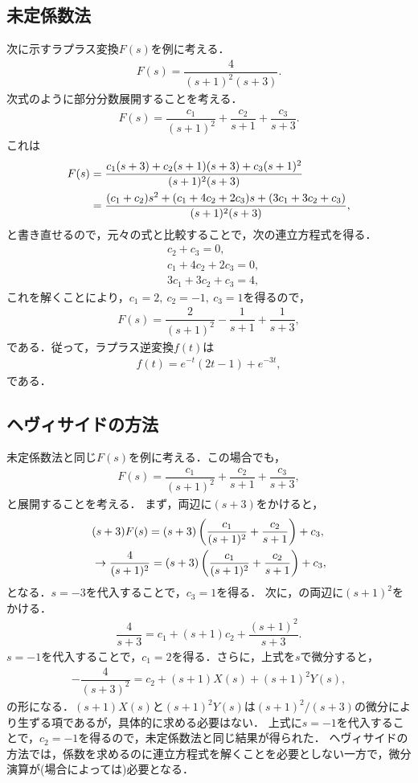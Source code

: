 \subsection{未定係数法}
%
次に示すラプラス変換$F(s)$を例に考える．
\begin{align}
 F(s) = \dfrac{4}{(s+1)^2(s+3)}. 
\end{align}
%
次式のように部分分数展開することを考える．
\begin{align}
 F(s) = \dfrac{c_1}{(s+1)^2} + \dfrac{c_2}{s+1} + \dfrac{c_3}{s+3}. 
\end{align}
%
これは
\begin{align}
 F(s) &= \dfrac{c_1(s+3)+c_2(s+1)(s+3) + c_3(s+1)^2}{(s+1)^2(s+3)} \notag \\
      &= \dfrac{(c_1+c_2)s^2+(c_1+4c_2+2c_3)s+(3c_1+3c_2+c_3)}{(s+1)^2(s+3)}, 
\end{align}
と書き直せるので，元々の式と比較することで，次の連立方程式を得る．
\begin{align}
  &c_2  +  c_3 = 0, \\
  &c_1  + 4c_2 + 2 c_3 = 0, \\
  &3c_1 + 3c_2 +   c_3 = 4, 
\end{align}
これを解くことにより，$c_1=2,~c_2=-1,~c_3=1$を得るので，
\begin{align}
 F(s) = \dfrac{2}{(s+1)^2} - \dfrac{1}{s+1} + \dfrac{1}{s+3}, 
\end{align}
である．従って，ラプラス逆変換$f(t)$は
\begin{align}
 f(t) = e^{-t}(2t - 1) + e^{-3t}, 
\end{align}
である．
%
\subsection{ヘヴィサイドの方法}
%
未定係数法と同じ$F(s)$を例に考える．この場合でも，
\begin{align}
 F(s) = \dfrac{c_1}{(s+1)^2} + \dfrac{c_2}{s+1} + \dfrac{c_3}{s+3}, \label{pfe_ex01} 
\end{align}
と展開することを考える．
まず，両辺に$(s+3)$をかけると，
\begin{align}
 &             (s+3)F(s)          = (s+3)\left(\dfrac{c_1}{(s+1)^2}+\dfrac{c_2}{s+1}\right) + c_3, \notag \\
 &\rightarrow  \dfrac{4}{(s+1)^2} = (s+3)\left(\dfrac{c_1}{(s+1)^2}+\dfrac{c_2}{s+1}\right) + c_3,
\end{align}
となる．$s=-3$を代入することで，$c_3=1$を得る．
次に，の両辺に$(s+1)^2$をかける．
\begin{align}
 \dfrac{4}{s+3} = c_1 + (s+1)c_2 + \dfrac{(s+1)^2}{s+3}. \label{pfe_ex01_heav01} 
\end{align}
$s=-1$を代入することで，$c_1 = 2$を得る．さらに，上式を$s$で微分すると，
\begin{align}
 -\dfrac{4}{(s+3)^2} = c_2 + (s+1)X(s) + (s+1)^2 Y(s), 
\end{align}
の形になる．$(s+1)X(s)$と$(s+1)^2Y(s)$は$(s+1)^2/(s+3)$の微分により生ずる項であるが，具体的に求める必要はない．
上式に$s=-1$を代入することで，$c_2 = -1$を得るので，未定係数法と同じ結果が得られた．
ヘヴィサイドの方法では，係数を求めるのに連立方程式を解くことを必要としない一方で，微分演算が(場合によっては)必要となる．

